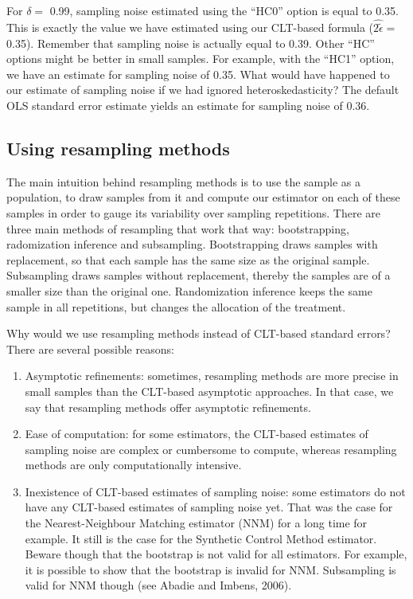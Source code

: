 \documentclass[]{book}
\providecommand{\tightlist}{%
  \setlength{\itemsep}{0pt}\setlength{\parskip}{0pt}}
\theoremstyle{definition}
\theoremstyle{definition}
\theoremstyle{definition}
\theoremstyle{remark}
\begin{document}
For \(\delta=\) 0.99, sampling noise estimated using the ``HC0'' option
is equal to 0.35. This is exactly the value we have estimated using our
CLT-based formula (\(\hat{2\tilde{\epsilon}}=\) 0.35). Remember that
sampling noise is actually equal to 0.39. Other ``HC'' options might be
better in small samples. For example, with the ``HC1'' option, we have
an estimate for sampling noise of 0.35. What would have happened to our
estimate of sampling noise if we had ignored heteroskedasticity? The
default OLS standard error estimate yields an estimate for sampling
noise of 0.36.

\subsection{Using resampling methods}\label{sec:resamp}

The main intuition behind resampling methods is to use the sample as a
population, to draw samples from it and compute our estimator on each of
these samples in order to gauge its variability over sampling
repetitions. There are three main methods of resampling that work that
way: bootstrapping, radomization inference and subsampling.
Bootstrapping draws samples with replacement, so that each sample has
the same size as the original sample. Subsampling draws samples without
replacement, thereby the samples are of a smaller size than the original
one. Randomization inference keeps the same sample in all repetitions,
but changes the allocation of the treatment.

Why would we use resampling methods instead of CLT-based standard
errors? There are several possible reasons:

\begin{enumerate}
\def\labelenumi{\arabic{enumi}.}
\tightlist
\item
  Asymptotic refinements: sometimes, resampling methods are more precise
  in small samples than the CLT-based asymptotic approaches. In that
  case, we say that resampling methods offer asymptotic refinements.
\item
  Ease of computation: for some estimators, the CLT-based estimates of
  sampling noise are complex or cumbersome to compute, whereas
  resampling methods are only computationally intensive.
\item
  Inexistence of CLT-based estimates of sampling noise: some estimators
  do not have any CLT-based estimates of sampling noise yet. That was
  the case for the Nearest-Neighbour Matching estimator (NNM) for a long
  time for example. It still is the case for the Synthetic Control
  Method estimator. Beware though that the bootstrap is not valid for
  all estimators. For example, it is possible to show that the bootstrap
  is invalid for NNM. Subsampling is valid for NNM though (see Abadie
  and Imbens, 2006).
\end{enumerate}
\end{document}
